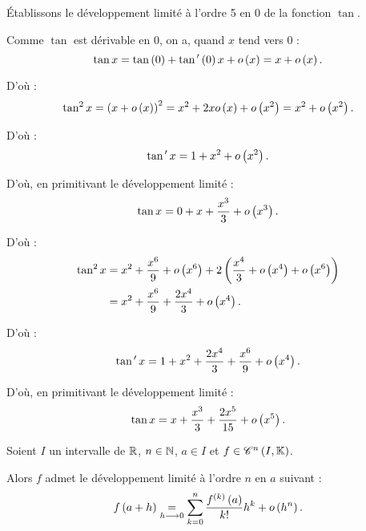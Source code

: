 \begin{appl}
Établissons le développement limité à l'ordre 5 en \(0\) de la fonction \(\tan\).

Comme \(\tan\) est dérivable en \(0\), on a, quand \(x\) tend vers \(0\) : \[\tan x=\tan\left(0\right)+\tan^{\,\prime}\left(0\right)x+o\left(x\right)=x+o\left(x\right).\]

D'où : \[\tan^2x=\left(x+o\left(x\right)\right)^2=x^2+2xo\left(x\right)+o\left(x^2\right)=x^2+o\left(x^2\right).\]

D'où : \[\tan^{\,\prime} x=1+x^2+o\left(x^2\right).\]

D'où, en primitivant le développement limité : \[\tan x=0+x+\dfrac{x^3}{3}+o\left(x^3\right).\]

D'où : \[\begin{aligned}
\tan^2x&=x^2+\dfrac{x^6}{9}+o\left(x^6\right)+2\left(\dfrac{x^4}{3}+o\left(x^4\right)+o\left(x^6\right)\right) \\
&=x^2+\dfrac{x^6}{9}+\dfrac{2x^4}{3}+o\left(x^4\right).
\end{aligned}\]

D'où : \[\tan^{\,\prime} x=1+x^2+\dfrac{2x^4}{3}+\dfrac{x^6}{9}+o\left(x^4\right).\]

D'où, en primitivant le développement limité : \[\tan x=x+\dfrac{x^3}{3}+\dfrac{2x^5}{15}+o\left(x^5\right).\]
\end{appl}

\begin{theo}
Soient \(I\) un intervalle de \(\mathbb{R}\), \(n\in\mathbb{N}\), \(a\in I\) et \(f\in\mathscr{C}^{n}\left(I,\mathbb{K}\right)\).

Alors \(f\) admet le développement limité à l'ordre \(n\) en \(a\) suivant : \[f\left(a+h\right)\underset{h\longrightarrow0}{=}\sum_{k=0}^n\dfrac{f^{\left(k\right)}\left(a\right)}{k!}h^k+o\left(h^n\right).\]
\end{theo}

